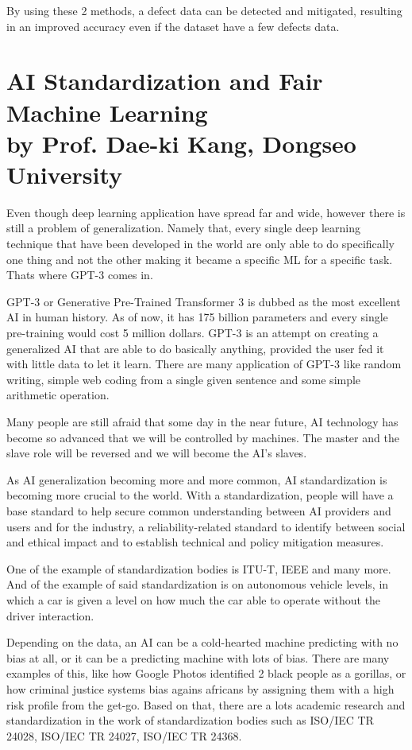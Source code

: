 \documentclass[12pt, a4paper]{article}
\begin{document}
By using these 2 methods, a defect data can be detected and mitigated, resulting in an improved accuracy even if the dataset have a few defects data.

\section*{AI Standardization and Fair Machine Learning \\ \footnotesize by Prof. Dae-ki Kang, Dongseo University}

Even though deep learning application have spread far and wide, however there is still a problem of generalization. Namely that, every single deep learning technique that have been developed in the world are only able to do specifically one thing and not the other making it became a specific ML for a specific task. Thats where GPT-3 comes in.

GPT-3 or Generative Pre-Trained Transformer 3 is dubbed as the most excellent AI in human history. As of now, it has 175 billion parameters and every single pre-training would cost 5 million dollars. GPT-3 is an attempt on creating a generalized AI that are able to do basically anything, provided the user fed it with little data to let it learn. There are many application of GPT-3 like random writing, simple web coding from a single given sentence and some simple arithmetic operation.

Many people are still afraid that some day in the near future, AI technology has become so advanced that we will be controlled by machines. The master and the slave role will be reversed and we will become the AI's slaves.

As AI generalization becoming more and more common, AI standardization is becoming more crucial to the world. With a standardization, people will have a base standard to help secure common understanding between AI providers and users and for the industry, a reliability-related standard to identify between social and ethical impact and to establish technical and policy mitigation measures.

One of the example of standardization bodies is ITU-T, IEEE and many more. And of the example of said standardization is on autonomous vehicle levels, in which a car is given a level on how much the car able to operate without the driver interaction.

Depending on the data, an AI can be a cold-hearted machine predicting with no bias at all, or it can be a predicting machine with lots of bias. There are many examples of this, like how Google Photos identified 2 black people as a gorillas, or how criminal justice systems bias agains africans by assigning them with a high risk profile from the get-go. Based on that, there are a lots academic research and standardization in the work of standardization bodies such as ISO/IEC TR 24028, ISO/IEC TR 24027, ISO/IEC TR 24368.
\end{document}
